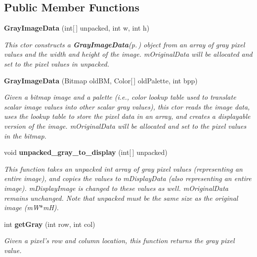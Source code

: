 \subsection*{Public Member Functions}
\begin{CompactItemize}
\item 
{\bf Gray\-Image\-Data} (int[$\,$] unpacked, int w, int h)
\begin{CompactList}\small\item\em This ctor constructs a {\bf Gray\-Image\-Data}{\rm (p.\,\pageref{class_c_s_image_viewer_1_1_gray_image_data})} object from an array of gray pixel values and the width and height of the image. m\-Original\-Data will be allocated and set to the pixel values in unpacked. \item\end{CompactList}\item 
{\bf Gray\-Image\-Data} (Bitmap old\-BM, Color[$\,$] old\-Palette, int bpp)
\begin{CompactList}\small\item\em Given a bitmap image and a palette (i.e., color lookup table used to translate scalar image values into other scalar gray values), this ctor reads the image data, uses the lookup table to store the pixel data in an array, and creates a displayable version of the image. m\-Original\-Data will be allocated and set to the pixel values in the bitmap. \item\end{CompactList}\item 
void {\bf unpacked\_\-gray\_\-to\_\-display} (int[$\,$] unpacked)
\begin{CompactList}\small\item\em This function takes an unpacked int array of gray pixel values (representing an entire image), and copies the values to m\-Display\-Data (also representing an entire image). m\-Display\-Image is changed to these values as well. m\-Original\-Data remains unchanged. Note that unpacked must be the same size as the original image (m\-W$\ast$m\-H). \item\end{CompactList}\item 
int {\bf get\-Gray} (int row, int col)
\begin{CompactList}\small\item\em Given a pixel's row and column location, this function returns the gray pixel value. \item\end{CompactList}\end{CompactItemize}


